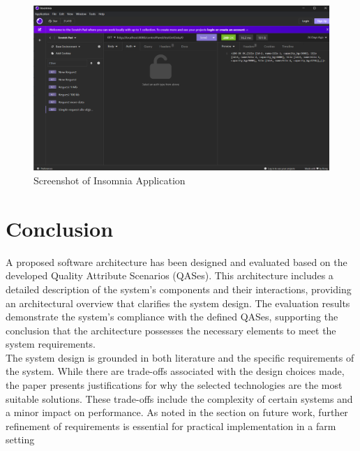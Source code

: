 \documentclass[conference]{IEEEtran}
\begin{document}

\begin{figure}[ht]
    \centering
    \includegraphics[width=\linewidth]{./Images/Insomnia1.png}
    \caption{Screenshot of Insomnia Application}
    \label{fig:insomnia1}
\end{figure}



\section{Conclusion}
A proposed software architecture has been designed and evaluated based on the developed Quality Attribute Scenarios (QASes). This architecture includes a detailed description of the system's components and their interactions, providing an architectural overview that clarifies the system design. The evaluation results demonstrate the system's compliance with the defined QASes, supporting the conclusion that the architecture possesses the necessary elements to meet the system requirements.\\
The system design is grounded in both literature and the specific requirements of the system. While there are trade-offs associated with the design choices made, the paper presents justifications for why the selected technologies are the most suitable solutions. These trade-offs include the complexity of certain systems and a minor impact on performance. As noted in the section on future work, further refinement of requirements is essential for practical implementation in a farm setting



\vspace{12pt}
\end{document}
